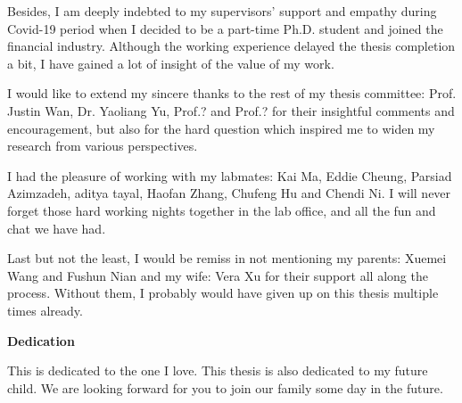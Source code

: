 Besides, I am deeply indebted to my supervisors' support and empathy during Covid-19 period when I decided to be a part-time Ph.D. student and joined the financial industry. Although the working experience delayed the thesis completion a bit, I have gained a lot of insight of the value of my work. 
 
I would like to extend my sincere thanks to
the rest of my thesis committee: Prof. Justin Wan, Dr. Yaoliang Yu, Prof.? and Prof.? for their insightful comments and encouragement, but also for the hard question which inspired me to widen my research from various perspectives.


I had the pleasure of working with my 
labmates: Kai Ma, Eddie Cheung, Parsiad Azimzadeh, aditya  tayal, Haofan Zhang, Chufeng Hu and Chendi Ni.
I will never forget those hard working nights together in the lab office, and all the fun and chat we have had.

Last but not the least, I would be remiss in not mentioning my parents: Xuemei Wang and Fushun Nian and my wife: Vera Xu for their support all along the process.  Without them, I probably would have given up on this thesis multiple times already.
\cleardoublepage


\begin{center}\textbf{Dedication}\end{center}

This is dedicated to the one I love. This thesis is also dedicated to my future child. We are looking forward for you to join our family some day in the future.
\cleardoublepage

\renewcommand\contentsname{Table of Contents}
\tableofcontents
\cleardoublepage
{}    %

\listoftables
\cleardoublepage
{}		%

\listoffigures
\cleardoublepage
{}		%



\listofalgorithms
\cleardoublepage
{}		%
\printglossaries
\cleardoublepage
{}		%


